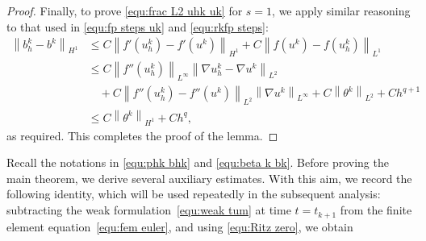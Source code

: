\documentclass[11pt, reqno]{amsart}
\theoremstyle{definition}
\numberwithin{equation}{section}
\newcommand{\norm}[2]{\left\|{#1}\right\|_{#2}}
\begin{document}
\begin{proof}
Finally, to prove \eqref{equ:frac L2 uhk uk} for $s=1$, we apply similar reasoning to that used in \eqref{equ:fp steps uk} and \eqref{equ:rkfp steps}:
\begin{align*}
	\norm{b_h^k-b^k}{H^1}
	&\leq
	C\norm{f'(u_h^k)-f'(u^k)}{H^1} + C\norm{f(u^k)-f(u_h^k)}{L^1}
	\\
	&\leq
	C \norm{f''(u_h^k)}{L^\infty} \norm{\nabla u_h^k-\nabla u^k}{L^2}
	\\
	&\quad
	+
	C \norm{f''(u_h^k)-f''(u^k)}{L^2} \norm{\nabla u^k}{L^\infty}
	+
	C\norm{\theta^k}{L^2} + Ch^{q+1}
	\\
	&\leq
	C\norm{\theta^k}{H^1} + Ch^q,
\end{align*}
as required. This completes the proof of the lemma.
\end{proof}


Recall the notations in \eqref{equ:phk bhk} and \eqref{equ:beta k bk}. Before proving the main theorem, we derive several auxiliary estimates. With this aim, we record the following identity, which will be used repeatedly in the subsequent analysis: subtracting the weak formulation~\eqref{equ:weak tum} at time $t=t_{k+1}$ from the finite element equation~\eqref{equ:fem euler}, and using \eqref{equ:Ritz zero}, we obtain
\end{document}
